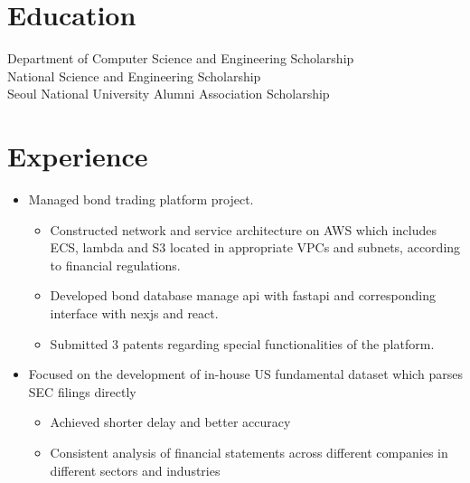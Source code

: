 \documentclass[11pt,a4paper,sans]{moderncv}        %
\begin{document}
\makecvtitle%
\vspace*{-10mm}

\section{Education}
{Department of Computer Science and Engineering Scholarship\\
National Science and Engineering Scholarship\\
Seoul National University Alumni Association Scholarship}

\section{Experience}
{\begin{itemize}%
    \item Managed bond trading platform project.
        \begin{itemize}%
            \item Constructed network and service architecture on AWS which includes ECS, lambda and S3 located in appropriate VPCs and subnets, according to financial regulations.
            \item Developed bond database manage api with fastapi and corresponding interface with nexjs and react.
            \item Submitted 3 patents regarding special functionalities of the platform.
        \end{itemize}
\end{itemize}}

{\begin{itemize}%
    \item Focused on the development of in-house US fundamental dataset which parses SEC filings directly
        \begin{itemize}%
            \item Achieved shorter delay and better accuracy
            \item Consistent analysis of financial statements across different companies in different sectors and industries
        \end{itemize}
\end{itemize}}
\end{document}

